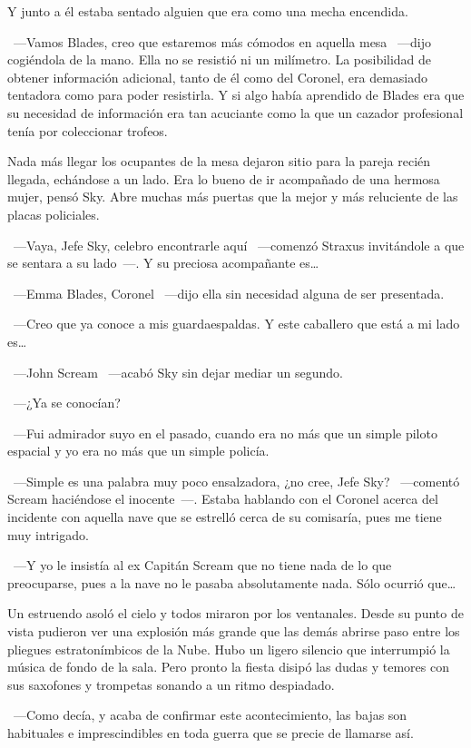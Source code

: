 Y junto a él estaba sentado alguien que era como una mecha encendida.

~---Vamos Blades, creo que estaremos más cómodos en aquella mesa ~---dijo cogiéndola de la mano. Ella no se resistió ni un milímetro. La posibilidad de obtener información adicional, tanto de él como del Coronel, era demasiado tentadora como para poder resistirla. Y si algo había aprendido de Blades era que su necesidad de información era tan acuciante como la que un cazador profesional tenía por coleccionar trofeos.

Nada más llegar los ocupantes de la mesa dejaron sitio para la pareja recién llegada, echándose a un lado. Era lo bueno de ir acompañado de una hermosa mujer, pensó Sky. Abre muchas más puertas que la mejor y más reluciente de las placas policiales.

~---Vaya, Jefe Sky, celebro encontrarle aquí ~---comenzó Straxus invitándole a que se sentara a su lado~---. Y su preciosa acompañante es\dots

~---Emma Blades, Coronel ~---dijo ella sin necesidad alguna de ser presentada.

~---Creo que ya conoce a mis guardaespaldas. Y este caballero que está a mi lado es\dots

~---John Scream ~---acabó Sky sin dejar mediar un segundo.

~---¿Ya se conocían?

~---Fui admirador suyo en el pasado, cuando era no más que un simple piloto espacial y yo era no más que un simple policía.

~---Simple es una palabra muy poco ensalzadora, ¿no cree, Jefe Sky? ~---comentó Scream haciéndose el inocente~---. Estaba hablando con el Coronel acerca del incidente con aquella nave que se estrelló cerca de su comisaría, pues me tiene muy intrigado.

~---Y yo le insistía al ex Capitán Scream que no tiene nada de lo que preocuparse, pues a la nave no le pasaba absolutamente nada. Sólo ocurrió que\dots

Un estruendo asoló el cielo y todos miraron por los ventanales. Desde su punto de vista pudieron ver una explosión más grande que las demás abrirse paso entre los pliegues estratonímbicos de la Nube. Hubo un ligero silencio que interrumpió la música de fondo de la sala. Pero pronto la fiesta disipó las dudas y temores con sus saxofones y trompetas sonando a un ritmo despiadado.

~---Como decía, y acaba de confirmar este acontecimiento, las bajas son habituales e imprescindibles en toda guerra que se precie de llamarse así.

